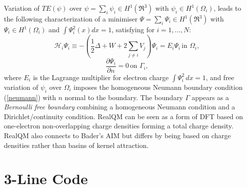 \documentclass[11pt]{article} %
\begin{document}
Variation of $TE(\psi )$ over $\psi =\sum_i\psi_i\in H^1(\Re^3)$ with $\psi_i\in H^1(\Omega_i )$,  leads to the following characterization of a minimiser $\Psi =\sum_i\Psi_i\in H^1(\Re^3)$ with $\Psi_i\in H^1(\Omega_i)$ and $\int\Psi_i^2(x)dx=1$,  satisfying for $i=1,...,N$:
\begin{equation}\label{Hi}
\mathcal{H}_i\Psi_i\equiv -(\frac{1}{2}\Delta+W+2\sum_{j\neq i}V_j)\Psi_i = E_i\Psi_i\,\mbox{in }\Omega_i,
\end{equation}
\begin{equation}\label{neumann}
 \frac{\partial\Psi_i}{\partial n}=0\,\mbox{on }\Gamma_i,
\end{equation}
where $E_i$ is the Lagrange multiplier for electron charge $\int\Psi_i^2\,dx=1$,  and free variation of  $\psi_i$ over $\Omega_i$ imposes the homogeneous Neumann boundary condition (\ref{neumann}) with $n$ normal to the boundary.  The boundary $\Gamma$ appears as a \emph{Bernoulli free boundary} combining a homogeneous Neumann condition and a Dirichlet/continuity condition.  RealQM can be seen as a form of DFT \cite{koch} based on one-electron non-overlapping charge densities forming a total charge density.  RealQM also connects to Bader's AIM \cite{bader} but differs by being based on charge densities rather than basins of kernel attraction. 


\section{3-Line Code}
\end{document}
